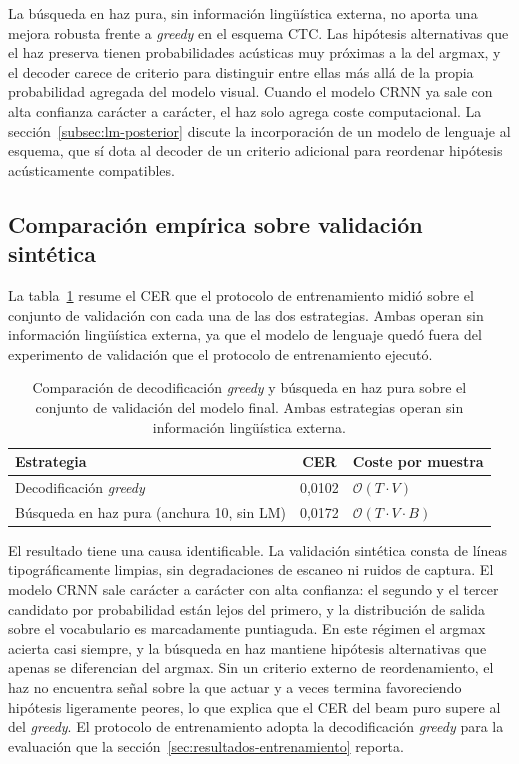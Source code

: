 La búsqueda en haz pura, sin información lingüística externa, no aporta una mejora robusta frente a \textit{greedy} en el esquema CTC. Las hipótesis alternativas que el haz preserva tienen probabilidades acústicas muy próximas a la del argmax, y el decoder carece de criterio para distinguir entre ellas más allá de la propia probabilidad agregada del modelo visual. Cuando el modelo CRNN ya sale con alta confianza carácter a carácter, el haz solo agrega coste computacional. La sección~\ref{subsec:lm-posterior} discute la incorporación de un modelo de lenguaje al esquema, que sí dota al decoder de un criterio adicional para reordenar hipótesis acústicamente compatibles.

\subsection{Comparación empírica sobre validación sintética}
\label{subsec:greedy-vs-beam}

La tabla~\ref{tab:greedy-vs-beam} resume el CER que el protocolo de entrenamiento midió sobre el conjunto de validación con cada una de las dos estrategias. Ambas operan sin información lingüística externa, ya que el modelo de lenguaje quedó fuera del experimento de validación que el protocolo de entrenamiento ejecutó.

\begin{table}[!htbp]
	\centering
	\caption{Comparación de decodificación \textit{greedy} y búsqueda en haz pura sobre el conjunto de validación del modelo final. Ambas estrategias operan sin información lingüística externa.}
	\label{tab:greedy-vs-beam}
	\begin{tabular}{lcl}
		\toprule
		\textbf{Estrategia} & \textbf{CER} & \textbf{Coste por muestra} \\
		\midrule
		Decodificación \textit{greedy}                       & 0,0102 & $\mathcal{O}(T\cdot V)$ \\
		Búsqueda en haz pura (anchura 10, sin LM)            & 0,0172 & $\mathcal{O}(T\cdot V \cdot B)$ \\
		\bottomrule
	\end{tabular}
\end{table}

El resultado tiene una causa identificable. La validación sintética consta de líneas tipográficamente limpias, sin degradaciones de escaneo ni ruidos de captura. El modelo CRNN sale carácter a carácter con alta confianza: el segundo y el tercer candidato por probabilidad están lejos del primero, y la distribución de salida sobre el vocabulario es marcadamente puntiaguda. En este régimen el argmax acierta casi siempre, y la búsqueda en haz mantiene hipótesis alternativas que apenas se diferencian del argmax. Sin un criterio externo de reordenamiento, el haz no encuentra señal sobre la que actuar y a veces termina favoreciendo hipótesis ligeramente peores, lo que explica que el CER del beam puro supere al del \textit{greedy}. El protocolo de entrenamiento adopta la decodificación \textit{greedy} para la evaluación que la sección~\ref{sec:resultados-entrenamiento} reporta.

